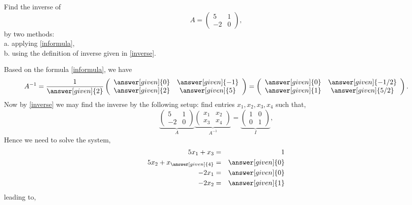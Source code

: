 \documentclass{ximera}
\begin{document}
\begin{example}\label{ex2}
Find the inverse of
\[
A= \left(\begin{array}{cc}
  5 &  1 \\
  -2 &  0
\end{array}\right),
\]
by two methods:\\
 a. applying \eqref{informula},\\
 b. using the definition of inverse given in \eqref{inverse}.

\begin{prompt}
Based on the formula \eqref{informula}, we have
\begin{equation}\label{Amatrix}
A^{-1}= \frac{1}{\answer[given]{2}} \left(\begin{array}{cc}
  \answer[given]{0} &  \answer[given]{-1} \\
  \answer[given]{2} &  \answer[given]{5}
\end{array}\right)= \left(\begin{array}{cc}
  \answer[given]{0} &  \answer[given]{-1/2} \\
  \answer[given]{1} &  \answer[given]{5/2}
\end{array}\right).
\end{equation}
Now by \eqref{inverse} we may find the inverse by the following setup: find entries $x_{1}, x_{2}, x_{3}, x_{4}$ such that,
\begin{equation}\label{setup}
\underbrace{\left(\begin{array}{cc}
  5 &  1 \\
  -2 &  0
\end{array}\right)}_{A}\underbrace{\left(\begin{array}{cc}
  x_{1} &  x_{2} \\
  x_{3} &  x_{4}
\end{array}\right)}_{A^{-1}}= \underbrace{\left(\begin{array}{cc}
  1 &  0 \\
  0 &  1
\end{array}\right)}_{I},
\end{equation}
Hence we need to solve the system,
\begin{eqnarray*}
5x_{1}+x_{3}&=&1\\
5x_{2} + x_{\answer[given]{4}} &=& \answer[given]{0}\\
-2x_{1}&=& \answer[given]{0}\\
-2x_{2} &=& \answer[given]{1}
\end{eqnarray*}
leading to,
\begin{equation}\label{entries}

\end{equation}
\end{prompt}
\end{example}
\end{document}
